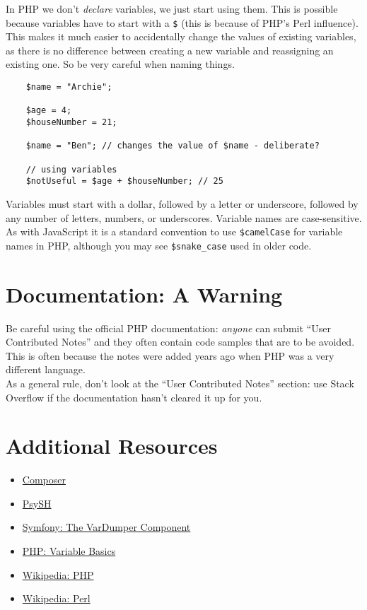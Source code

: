 In PHP we don't \textit{declare} variables, we just start using them. This is possible because variables have to start with a \texttt{\$} (this is because of PHP's Perl influence).
\\

This makes it much easier to accidentally change the values of existing variables, as there is no difference between creating a new variable and reassigning an existing one. So be very careful when naming things.

\begin{verbatim}
    $name = "Archie";

    $age = 4;
    $houseNumber = 21;

    $name = "Ben"; // changes the value of $name - deliberate?

    // using variables
    $notUseful = $age + $houseNumber; // 25
\end{verbatim}

Variables must start with a dollar, followed by a letter or underscore, followed by any number of letters, numbers, or underscores. Variable names are case-sensitive.
\\

As with JavaScript it is a standard convention to use \texttt{\$camelCase} for variable names in PHP, although you may see \texttt{\$snake\_case} used in older code.


\section{Documentation: A Warning}

Be careful using the official PHP documentation: \textit{anyone} can submit ``User Contributed Notes'' and they often contain code samples that are to be avoided. This is often because the notes were added years ago when PHP was a very different language.
\\

As a general rule, don't look at the ``User Contributed Notes'' section: use Stack Overflow if the documentation hasn't cleared it up for you.



\section{Additional Resources}

\begin{itemize}[leftmargin=*]
    \item \href{https://getcomposer.org/}{Composer}
    \item \href{https://psysh.org/}{PsySH}
    \item \href{https://symfony.com/doc/current/components/var_dumper.html}{Symfony: The VarDumper Component}
    \item \href{http://php.net/manual/en/language.variables.basics.php}{PHP: Variable Basics}
    \item \href{https://en.wikipedia.org/wiki/PHP}{Wikipedia: PHP}
    \item \href{https://en.wikipedia.org/wiki/Perl}{Wikipedia: Perl}
\end{itemize}
